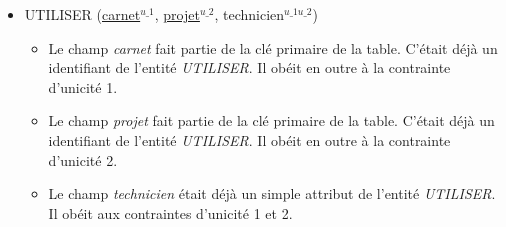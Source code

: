 \documentclass[a4paper]{article}
\newcommand{\relat}[1]{\textsc{#1}}
\newcommand{\attr}[1]{#1}
\newcommand{\prim}[1]{\uline{#1}}
\begin{document}
\begin{itemize}
  \item \relat{UTILISER} (\prim{carnet}$^{u\_1}$, \prim{projet}$^{u\_2}$, \attr{technicien}$^{u\_1 u\_2}$)
  \begin{itemize}
    \item Le champ \emph{carnet} fait partie de la clé primaire de la table. C'était déjà un identifiant de l'entité \emph{UTILISER}. Il obéit en outre à la contrainte d'unicité 1.
    \item Le champ \emph{projet} fait partie de la clé primaire de la table. C'était déjà un identifiant de l'entité \emph{UTILISER}. Il obéit en outre à la contrainte d'unicité 2.
    \item Le champ \emph{technicien} était déjà un simple attribut de l'entité \emph{UTILISER}. Il obéit aux contraintes d'unicité 1 et 2.
  \end{itemize}

\end{itemize}
\end{document}
